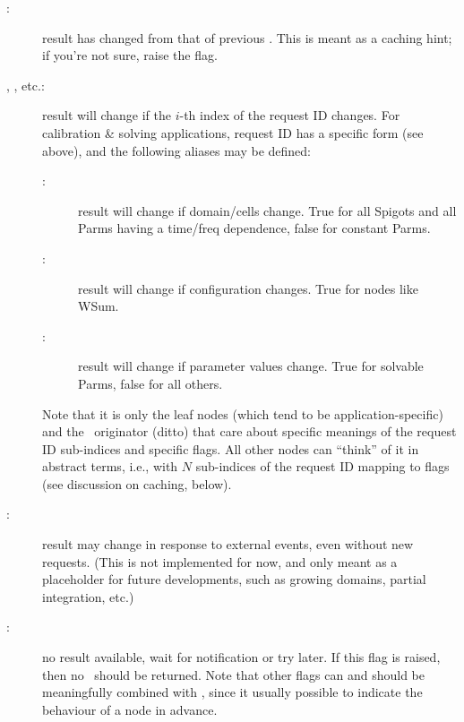 \documentclass[10pt]{article}
\begin{document}
  \begin{description}
  
  \item[:] result has changed from that of previous \Request. This
     is meant as a caching hint; if you're not sure, raise the flag.

  \item[, , etc.:] result will change if the $i$-th
    index of the request ID changes. For calibration \& solving applications,
    request ID has a specific form (see above), and the following aliases may
    be defined:

    \begin{description}
    
    \item[:] result will change if domain/cells
      change. True for all Spigots and all Parms having a time/freq dependence,
      false for constant Parms.

    \item[:] result will change if configuration
      changes. True for nodes like WSum.

    \item[:] result will change if parameter values
      change. True for solvable Parms, false for all others.

    \end{description}
    
    Note that it is only the leaf nodes (which tend to be application-specific)
    and the \Request\ originator (ditto) that care about specific meanings of
    the request ID sub-indices and specific  flags. All other nodes
    can ``think'' of it in abstract terms, i.e., with $N$ sub-indices of the
    request ID mapping to flags (see discussion on caching, below).

  \item[:] result may change in response to external events, even
    without new requests. (This is not implemented for now, and only meant as a
    placeholder for future developments, such as growing domains, partial
    integration, etc.)

  \item[:] no result available, wait for notification or try later. If
    this flag is raised, then no \Result\ should be returned. Note that other
    flags can and should be meaningfully combined with , since it
    usually possible to indicate the behaviour of a node in advance.

  \end{description}
\end{document}
